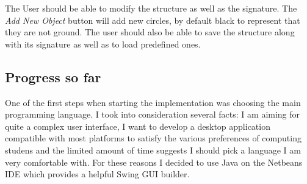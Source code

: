 \documentclass{article}
\begin{document}
\noindent The User should be able to modify the structure as well as the signature. The \emph{Add New Object} button will add new circles, by default black to represent that they are not ground. The user should also be able to save the structure along with its signature as well as to load predefined ones. \\

\subsection{Progress so far}

One of the first steps when starting the implementation was choosing the main programming language. I took into consideration several facts: I am aiming for quite a complex user interface, I want to develop a desktop application compatible with most platforms to satisfy the various preferences of computing studens and the limited amount of time suggests I should pick a language I am very comfortable with. For these reasons I decided to use Java on the Netbeans IDE which provides a helpful Swing GUI builder.
\end{document}
